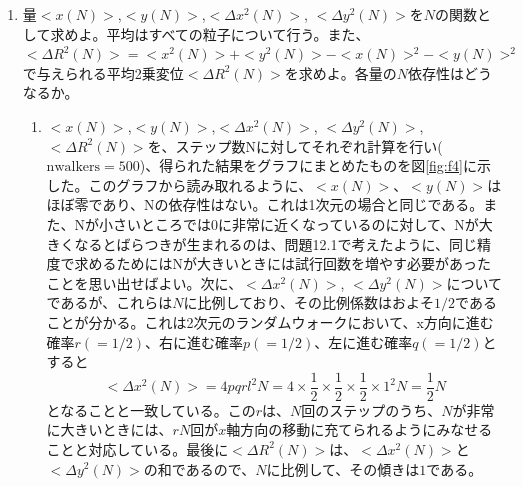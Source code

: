 \documentclass{jsarticle}
\begin{document}
\begin{enumerate}
\begin{enumerate}
                \end{enumerate}    
            
            \item 量$<x(N)>$,$<y(N)>$,$<\Delta x^{2}(N)>$, $<\Delta y^{2}(N)>$を$N$の関数として求めよ。平均はすべての粒子について行う。また、$<\Delta R^{2}(N)> = <x^{2}(N)> + <y^{2}(N)> -<x(N)>^{2} -<y(N)>^{2}$で与えられる平均2乗変位$<\Delta R^{2}(N)>$を求めよ。各量の$N$依存性はどうなるか。
            
                \begin{enumerate}
                    \item $<x(N)>$,$<y(N)>$,$<\Delta x^{2}(N)>$, $<\Delta y^{2}(N)>$,$<\Delta R^{2}(N)>$を、ステップ数Nに対してそれぞれ計算を行い($\mathrm{nwalkers}=500$)、得られた結果をグラフにまとめたものを図\ref{fig:f4}に示した。このグラフから読み取れるように、$<x(N)>$、$<y(N)>$はほぼ零であり、Nの依存性はない。これは1次元の場合と同じである。また、Nが小さいところでは0に非常に近くなっているのに対して、Nが大きくなるとばらつきが生まれるのは、問題12.1で考えたように、同じ精度で求めるためにはNが大きいときには試行回数を増やす必要があったことを思い出せばよい。次に、$<\Delta x^{2}(N)>$, $<\Delta y^{2}(N)>$についてであるが、これらは$N$に比例しており、その比例係数はおよそ$1/2$であることが分かる。これは2次元のランダムウォークにおいて、x方向に進む確率$r(=1/2)$、右に進む確率$p(=1/2)$、左に進む確率$q(=1/2)$とすると
                        \begin{equation}
                            <\Delta x^{2}(N)> = 4pqrl^{2}N = 4 \times \frac{1}{2} \times \frac{1}{2} \times \frac{1}{2} \times 1^{2}N = \frac{1}{2}N
                        \end{equation}
                    となることと一致している。この$r$は、$N$回のステップのうち、$N$が非常に大きいときには、$rN$回が$x$軸方向の移動に充てられるようにみなせることと対応している。最後に$<\Delta R^{2}(N)>$は、$<\Delta x^{2}(N)>$と$<\Delta y^{2}(N)>$の和であるので、$N$に比例して、その傾きは$1$である。


\end{enumerate}
\end{enumerate}
\end{document}
